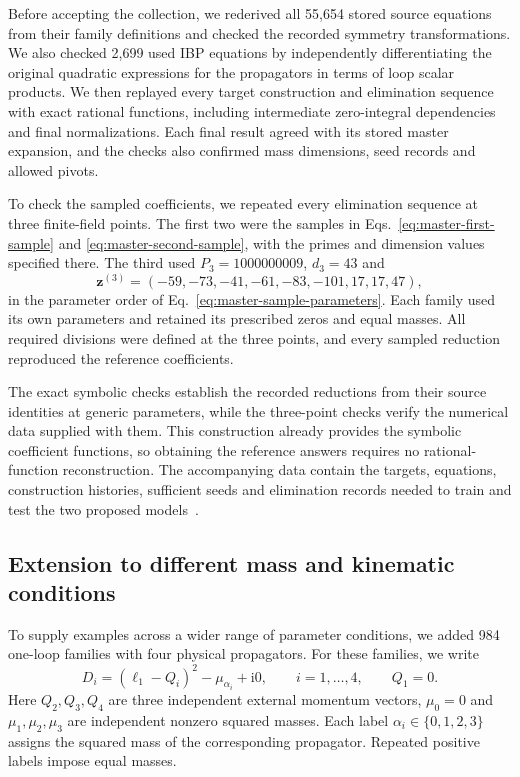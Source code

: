 \documentclass[11pt,a4paper]{article}
\begin{document}
Before accepting the collection, we rederived all 55,654 stored source
equations from their family definitions and checked the recorded
symmetry transformations. We also checked 2,699 used IBP equations
by independently differentiating the original quadratic expressions
for the propagators in terms of loop scalar products. We then replayed
every target construction and elimination sequence with exact rational
functions, including intermediate zero-integral dependencies and final
normalizations. Each final result agreed with its stored master
expansion, and the checks also confirmed mass dimensions, seed
records and allowed pivots.

To check the sampled coefficients, we repeated every elimination
sequence at three finite-field points. The first two were the samples
in Eqs.~\eqref{eq:master-first-sample} and
\eqref{eq:master-second-sample}, with the primes and dimension values
specified there. The third used $P_3=1000000009$, $d_3=43$ and
\begin{equation}
 \boldsymbol z^{(3)}
 =(-59,-73,-41,-61,-83,-101,17,17,47),
 \label{eq:target-third-sample}
\end{equation}
in the parameter order of Eq.~\eqref{eq:master-sample-parameters}.
Each family used its own parameters and retained its prescribed
zeros and equal masses. All required divisions were defined at the
three points, and every sampled reduction reproduced the reference
coefficients.

The exact symbolic checks establish the recorded reductions from
their source identities at generic parameters, while the three-point
checks verify the numerical data supplied with them. This construction
already provides the symbolic coefficient functions, so obtaining the
reference answers requires no rational-function reconstruction.
The accompanying data contain the targets, equations, construction
histories, sufficient seeds and elimination records needed to train
and test the two proposed models~\cite{TargetIntegralData}.


\subsection{Extension to different mass and kinematic conditions}
To supply examples across a wider range of parameter conditions, we
added 984 one-loop families with four physical propagators. For these
families, we write
\begin{equation}
 D_i=(\ell_1-Q_i)^2-\mu_{\alpha_i}+\mathrm{i}0,
 \qquad i=1,\ldots,4,\qquad Q_1=0.
 \label{eq:expanded-denominators}
\end{equation}
Here $Q_2,Q_3,Q_4$ are three independent external momentum vectors,
$\mu_0=0$ and $\mu_1,\mu_2,\mu_3$ are independent nonzero squared
masses. Each label $\alpha_i\in\{0,1,2,3\}$ assigns the squared mass
of the corresponding propagator. Repeated positive labels impose
equal masses.
\end{document}

